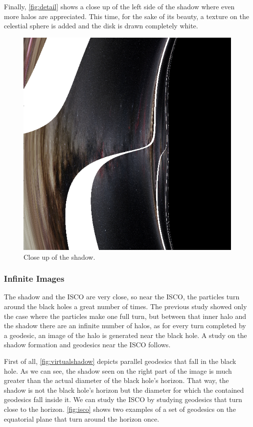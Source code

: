 Finally, \autoref{fig:detail} shows a close up of the left side of the shadow where even more halos are appreciated. This time, for the sake of its beauty, a texture on the celestial sphere is added and the disk is drawn completely white.

\begin{figure}[bth]
	\myfloatalign
	\includegraphics[width=.6\linewidth]{gfx/bh_detail_texture_disk-white}
	\caption[Close up of the shadow]{Close up of the shadow.}
	\label{fig:detail}
\end{figure}

\subsubsection*{Infinite Images}

The shadow and the \ac{ISCO} are very close, so near the \ac{ISCO}, the particles turn around the black holes a great number of times. The previous study showed only the case where the particles make one full turn, but between that inner halo and the shadow there are an infinite number of halos, as for every turn completed by a geodesic, an image of the halo is generated near the black hole. A study on the shadow formation and geodesics near the \ac{ISCO} follows.

First of all, \autoref{fig:virtualshadow} depicts parallel geodesics that fall in the black hole. As we can see, the shadow seen on the right part of the image is much greater than the actual diameter of the black hole's horizon. That way, the shadow is not the black hole's horizon but the diameter for which the contained geodesics fall inside it. We can study the \ac{ISCO} by studying geodesics that turn close to the horizon. \autoref{fig:isco} shows two examples of a set of geodesics on the equatorial plane that turn around the horizon once.

